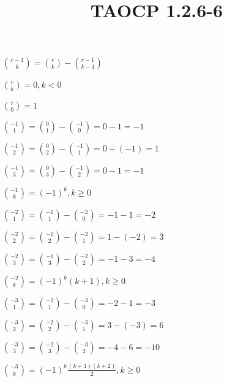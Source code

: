 \documentclass{article}
\title{TAOCP 1.2.6\mbox{-}6}
\begin{document}
\maketitle

\( \binom{r-1}{k} = \binom{r}{k} - \binom{r-1}{k-1} \)

\( \binom{r}{k} = 0, k < 0 \)

\( \binom{r}{0} = 1 \)

\( \binom{-1}{1} = \binom{0}{1} - \binom{-1}{0} = 0 - 1 = -1 \)

\( \binom{-1}{2} = \binom{0}{2} - \binom{-1}{1} = 0 - (-1) = 1 \)

\( \binom{-1}{3} = \binom{0}{3} - \binom{-1}{2} = 0 - 1 = -1 \)

\( \binom{-1}{k} = {(-1)}^{k}, k \geq 0 \)

\( \binom{-2}{1} = \binom{-1}{1} - \binom{-2}{0} = -1 - 1 = -2 \)

\( \binom{-2}{2} = \binom{-1}{2} - \binom{-2}{1} = 1 - (-2) = 3 \)

\( \binom{-2}{3} = \binom{-1}{3} - \binom{-2}{2} = -1 - 3 = -4 \)

\( \binom{-2}{k} = {(-1)}^{k} (k + 1), k \geq 0 \)

\( \binom{-3}{1} = \binom{-2}{1} - \binom{-3}{0} = -2 - 1 = -3 \)

\( \binom{-3}{2} = \binom{-2}{2} - \binom{-3}{1} = 3 - (-3) = 6 \)

\( \binom{-3}{3} = \binom{-2}{3} - \binom{-3}{2} = -4 - 6 = -10 \)

\( \binom{-3}{k} = {(-1)}^{k} \frac{(k + 1)(k + 2)}{2}, k \geq 0 \)
\end{document}
